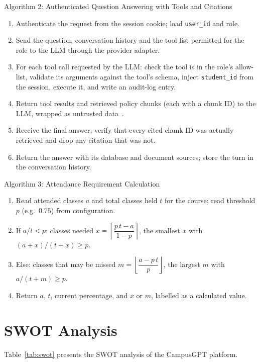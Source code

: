 \documentclass[11pt,a4paper,oneside]{report}
\begin{document}
\begin{algobox}{Algorithm 2: Authenticated Question Answering with Tools and Citations}
\begin{enumerate}[leftmargin=*,itemsep=1pt]
  \item Authenticate the request from the session cookie; load \texttt{user\_id} and role.
  \item Send the question, conversation history and the tool list permitted for the role to
        the LLM through the provider adapter.
  \item For each tool call requested by the LLM: check the tool is in the role's allow-list,
        validate its arguments against the tool's schema, inject \texttt{student\_id} from
        the session, execute it, and write an audit-log entry.
  \item Return tool results and retrieved policy chunks (each with a chunk ID) to the LLM,
        wrapped as untrusted data~\cite{greshake2023injection}.
  \item Receive the final answer; verify that every cited chunk ID was actually retrieved and
        drop any citation that was not.
  \item Return the answer with its database and document sources; store the turn in the
        conversation history.
\end{enumerate}
\end{algobox}

\begin{algobox}{Algorithm 3: Attendance Requirement Calculation}
\begin{enumerate}[leftmargin=*,itemsep=1pt]
  \item Read attended classes $a$ and total classes held $t$ for the course; read threshold
        $p$ (e.g.\ $0.75$) from configuration.
  \item If $a/t < p$: classes needed $x = \left\lceil \dfrac{p\,t - a}{1 - p} \right\rceil$,
        the smallest $x$ with $(a+x)/(t+x) \ge p$.
  \item Else: classes that may be missed
        $m = \left\lfloor \dfrac{a - p\,t}{p} \right\rfloor$, the largest $m$ with
        $a/(t+m) \ge p$.
  \item Return $a$, $t$, current percentage, and $x$ or $m$, labelled as a calculated value.
\end{enumerate}
\end{algobox}

\clearpage
\section{SWOT Analysis}
Table~\ref{tab:swot} presents the SWOT analysis of the CampusGPT platform.
\end{document}
